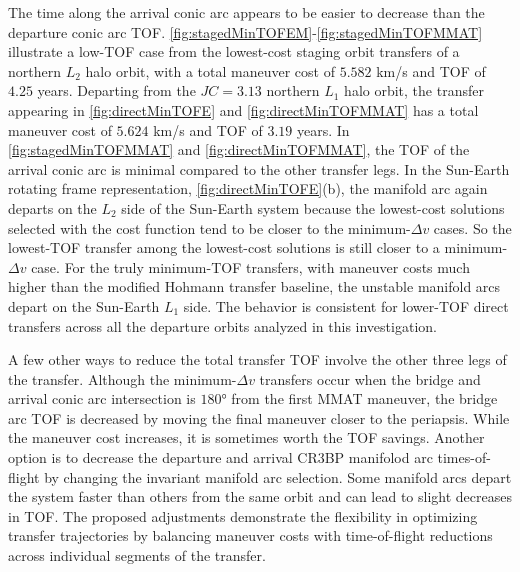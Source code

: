 The time along the arrival conic arc appears to be easier to decrease than the departure conic arc
TOF. \cref{fig:stagedMinTOFEM}-\cref{fig:stagedMinTOFMMAT} illustrate a low-TOF case from the
lowest-cost staging orbit transfers of a northern $L_{2}$ halo orbit, with a total maneuver cost of
$5.582$ km/s and TOF of $4.25$ years. Departing from the $JC=3.13$ northern $L_{1}$ halo orbit, the
transfer appearing in \cref{fig:directMinTOFE} and \cref{fig:directMinTOFMMAT} has a total maneuver
cost of $5.624$ km/s and TOF of $3.19$ years. In \cref{fig:stagedMinTOFMMAT} and
\cref{fig:directMinTOFMMAT}, the TOF of the arrival conic arc is minimal compared to the other
transfer legs. In the Sun-Earth rotating frame representation, \cref{fig:directMinTOFE}(b), the
manifold arc again departs on the $L_{2}$ side of the Sun-Earth system because the lowest-cost
solutions selected with the cost function tend to be closer to the minimum-$\Delta v$ cases. So the
lowest-TOF transfer among the lowest-cost solutions is still closer to a minimum-$\Delta v$ case.
For the truly minimum-TOF transfers, with maneuver costs much higher than the modified Hohmann
transfer baseline, the unstable manifold arcs depart on the Sun-Earth $L_{1}$ side. The behavior is
consistent for lower-TOF direct transfers across all the departure orbits analyzed in this
investigation.

A few other ways to reduce the total transfer TOF involve the other three legs of the transfer.
Although the minimum-$\Delta v$ transfers occur when the bridge and arrival conic arc intersection
is $\ang{180}$ from the first MMAT maneuver, the bridge arc TOF is decreased by moving the final
maneuver closer to the periapsis. While the maneuver cost increases, it is sometimes worth the TOF
savings. Another option is to decrease the departure and arrival CR3BP manifolod arc
times-of-flight by changing the invariant manifold arc selection. Some manifold arcs depart
the system faster than others from the same orbit and can lead to slight decreases in TOF. The
proposed adjustments demonstrate the flexibility in optimizing transfer trajectories by balancing
maneuver costs with time-of-flight reductions across individual segments of the transfer.

